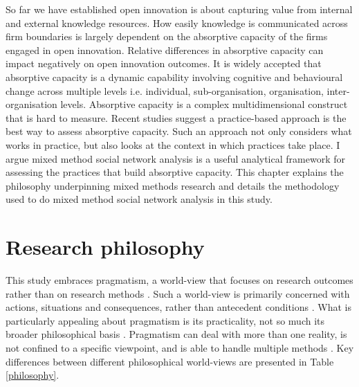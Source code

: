 
So far we have established open innovation is about capturing value from internal and external knowledge resources. How easily knowledge is communicated across firm boundaries is largely dependent on the absorptive capacity of the firms engaged in open innovation. Relative differences in absorptive capacity can impact negatively on open innovation outcomes. It is widely accepted that absorptive capacity is a dynamic capability involving cognitive and behavioural change across multiple levels i.e. individual, sub-organisation, organisation, inter-organisation levels. Absorptive capacity is a complex multidimensional construct that is hard to measure. Recent studies suggest a practice-based approach is the best way to assess absorptive capacity. Such an approach not only considers what works in practice, but also looks at the context in which practices take place. I argue mixed method social network analysis is a useful analytical framework for assessing the practices that build absorptive capacity. This chapter explains the philosophy underpinning mixed methods research and details the methodology used to do mixed method social network analysis in this study.

\section{Research philosophy}

This study embraces pragmatism, a world-view that focuses on research outcomes rather than on research methods \citep{tashakkori2010sage}. Such a world-view is primarily concerned with actions, situations and consequences, rather than antecedent conditions \citep{creswell2013research}. What is particularly appealing about pragmatism is its practicality, not so much its broader philosophical basis \citep{morgan2014pragmatism}. Pragmatism can deal with more than one reality, is not confined to a specific viewpoint, and is able to handle multiple methods \citep{johnson2004mixed}. Key differences between different philosophical world-views are presented in Table \ref{philosophy}.\medskip

